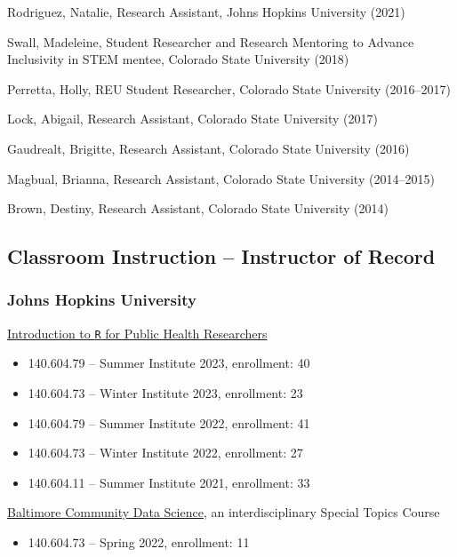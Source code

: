 \documentclass{cv}
\begin{document}
Rodriguez, Natalie, Research Assistant, Johns Hopkins University (2021)

Swall, Madeleine, Student Researcher and Research Mentoring to Advance Inclusivity in STEM mentee, Colorado State University (2018)

Perretta, Holly, REU Student Researcher, Colorado State University (2016--2017)

Lock, Abigail, Research Assistant, Colorado State University (2017)

Gaudrealt, Brigitte, Research Assistant, Colorado State University (2016)

Magbual, Brianna, Research Assistant, Colorado State University (2014--2015)

Brown, Destiny, Research Assistant, Colorado State University (2014)

\subsection*{Classroom Instruction -- Instructor of Record}

\subsubsection*{Johns Hopkins University}

\href{https://jhudatascience.org/intro_to_R_class/}{Introduction to \texttt{R} for Public Health Researchers}

\begin{itemize}

\item 140.604.79 -- Summer Institute 2023, enrollment: 40

\item 140.604.73 -- Winter Institute 2023, enrollment: 23

\item 140.604.79  -- Summer Institute 2022, enrollment: 41

\item 140.604.73 -- Winter Institute 2022, enrollment: 27

\item 140.604.11 -- Summer Institute 2021, enrollment: 33

\end{itemize}

\href{https://jhudatascience.org/Baltimore_Community_Course/index.html}{Baltimore Community Data Science}, an interdisciplinary Special Topics Course

\begin{itemize}

\item 140.604.73 -- Spring 2022, enrollment: 11

\end{itemize}
\end{document}
